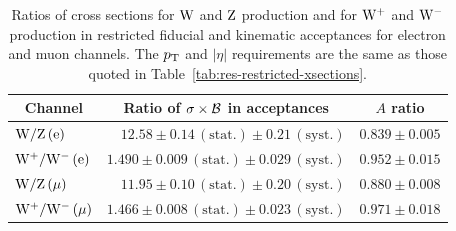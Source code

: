 \begin{table}[hbt] %
\begin{center}
\caption[.]{Ratios of cross sections for $\mathrm{W}$ and $\mathrm{Z}$ production and for $\mathrm{W}^+$ and $\mathrm{W}^-$ production
in restricted fiducial and kinematic acceptances for electron and muon channels.
The $p_{\mathrm{T}}$ and $|\eta|$ requirements are the same as those quoted in Table~\ref{tab:res-restricted-xsections}.
\label{tab:res-restricted-ratios} }
\begin{tabular}{|l|r|r|}
\hline
\multicolumn{1}{|c|}{Channel} &
\multicolumn{1}{|c|}{Ratio of $\sigma\times{\cal B}$ in acceptances} &
\multicolumn{1}{|c|}{$A$ ratio} \\
\hline
\hline
$\mathrm{W}/\mathrm{Z}\, (\mathrm{e})$  &  $12.58 \pm 0.14\,\mathrm{(stat.)} \pm 0.21\,\mathrm{(syst.)}$ & $0.839\pm 0.005$ \\
$\mathrm{W}^+/\mathrm{W}^-\, (\mathrm{e})$  &  $1.490 \pm 0.009\,\mathrm{(stat.)} \pm 0.029\,\mathrm{(syst.)}$ &$0.952\pm 0.015$ \\
\hline\hline
$\mathrm{W}/\mathrm{Z}\, (\mu)$  &  $11.95 \pm 0.10\,\mathrm{(stat.)} \pm 0.20\,\mathrm{(syst.)}$& $0.880\pm 0.008$  \\
$\mathrm{W}^+/\mathrm{W}^-\, (\mu)$  &  $1.466 \pm 0.008\,\mathrm{(stat.)} \pm 0.023\,\mathrm{(syst.)}$ & $0.971\pm 0.018$ \\
\hline
\end{tabular}
\end{center}
\end{table}


